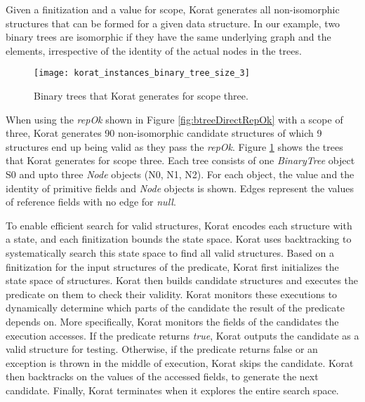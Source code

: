 \para
Given a finitization and a value for scope, Korat generates all non-isomorphic structures that can be formed for a given data structure. In our example, two binary trees are isomorphic if they have the same underlying graph and the elements, irrespective of the identity of the actual nodes in the trees. 

\begin{figure}
\centering
\texttt{[image: korat\_instances\_binary\_tree\_size\_3]}
\caption{Binary trees that Korat generates for scope three.}
\label{fig:btreeKoratGenScopeThree}
\end{figure}

\para
When using the \emph{repOk} shown in Figure \ref{fig:btreeDirectRepOk} with a scope of three, Korat generates 90 non-isomorphic candidate structures of which 9 structures end up being valid as they pass the \emph{repOk}. Figure \ref{fig:btreeKoratGenScopeThree} shows the trees that Korat generates for scope three. Each tree consists of one \emph{BinaryTree} object S0 and upto three \emph{Node} objects (N0, N1, N2). For each object, the value and the identity of primitive fields and \emph{Node} objects is shown. Edges represent the values of reference fields with no edge for \emph{null}.

\para
To enable efficient search for valid structures, Korat encodes each structure with a state, and each finitization bounds the state space. Korat uses backtracking to systematically search this state space to find all valid structures. Based on a finitization for the input structures of the predicate, Korat first initializes the state space of structures. Korat then builds candidate structures and executes the predicate on them to check their validity. Korat monitors these executions to dynamically determine which parts of the candidate the result of the predicate depends on. More specifically, Korat monitors the fields of the candidates the execution accesses. If the predicate returns \emph{true}, Korat outputs the candidate as a valid structure for testing. Otherwise, if the predicate returns false or an exception is thrown in the middle of execution, Korat skips the candidate. Korat then backtracks on the values of the accessed fields, to generate the next candidate. Finally, Korat terminates when it explores the entire search space. 

